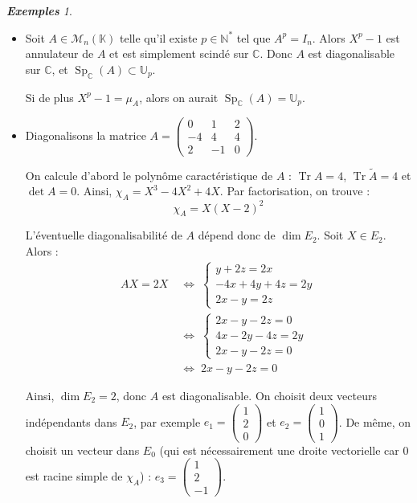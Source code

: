 \documentclass[12pt]{book}
\let\ensembleNombre\mathbb
\newcommand*\N{\ensuremath{\ensembleNombre{N}}}
\newcommand*\C{\ensuremath{\ensembleNombre{C}}}
\newcommand*\K{\ensuremath{\ensembleNombre{K}}}
\DeclareMathOperator{\Sp}{Sp}
\DeclareMathOperator{\Tr}{Tr}
\theoremstyle{definition}
\theoremstyle{remark}
\newtheorem*{exs}{\textbf{Exemples}}
\begin{document}
	\begin{exs}\mbox{~}\\
	\begin{itemize}
	\item Soit $A \in \mathcal M_n(\K)$ telle qu'il existe $p \in \N^*$ tel que $A^p = I_n$. Alors $X^p - 1$ est annulateur de $A$ et est simplement scindé sur $\C$. Donc $A$ est diagonalisable sur $\C$, et $\Sp_{\C}(A) \subset \mathbb U_p$.
	
	Si de plus $X^p - 1 = \mu_A$, alors on aurait $\Sp_{\C}(A) = \mathbb U_p$.
	
	\item Diagonalisons la matrice $A = \begin{pmatrix} 0 & 1 & 2 \\ -4 & 4 & 4 \\ 2 & -1 & 0 \end{pmatrix}$.
	
	On calcule d'abord le polynôme caractéristique de $A$ : $\Tr A = 4$, $\Tr \widetilde A = 4$ et $\det A = 0$. Ainsi, $\chi_A = X^3 - 4X^2 + 4X$. Par factorisation, on trouve :
	\[ \boxed{ \chi_A = X(X-2)^2 } \]
	
	L'éventuelle diagonalisabilité de $A$ dépend donc de $\dim E_2$. Soit $X \in E_2$. Alors :
	\begin{align*}
	AX = 2X \; &\Longleftrightarrow \; \begin{cases}
									   y + 2z = 2x \\
									   -4x + 4y + 4z = 2y \\
									   2x - y = 2z
									   \end{cases} \\
	&\Longleftrightarrow \; \begin{cases}
									   2x - y - 2z = 0 \\
									   4x - 2y - 4z = 2y \\
									   2x - y -2z = 0
									   \end{cases}\\
	&\Longleftrightarrow \; 2x - y - 2z = 0
	\end{align*}
	
	Ainsi, $\dim E_2 = 2$, donc $A$ est diagonalisable. On choisit deux vecteurs indépendants dans $E_2$, par exemple $e_1 = \begin{pmatrix} 1 \\ 2 \\ 0 \end{pmatrix}$ et $e_2 = \begin{pmatrix} 1 \\ 0 \\ 1 \end{pmatrix}$. De même, on choisit un vecteur dans $E_0$ (qui est nécessairement une droite vectorielle car $0$ est racine simple de $\chi_A$) : $e_3 = \begin{pmatrix} 1 \\ 2 \\ -1 \end{pmatrix}$.
	

\end{itemize}
\end{exs}
\end{document}
